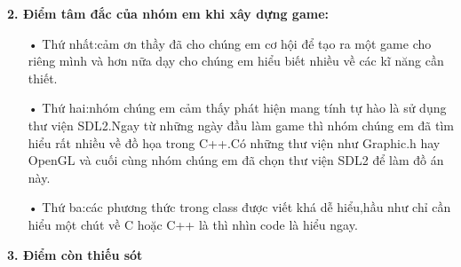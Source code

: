 \documentclass{article}
\begin{document}
\textbf{2. Điểm tâm đắc của nhóm em khi xây dựng game:}
\begin{itemize}
    \item [•]Thứ nhất:cảm ơn thầy đã cho chúng em cơ hội để tạo ra một game cho riêng mình và hơn nữa dạy cho chúng em hiểu biết nhiều về các kĩ năng cần thiết.
    \item[•]Thứ hai:nhóm chúng em cảm thấy phát hiện mang tính tự hào là sử dụng thư viện SDL2.Ngay từ những ngày đầu làm game thì nhóm chúng em đã tìm hiểu rất nhiều về đồ họa trong C++.Có những thư viện như Graphic.h hay OpenGL và cuối cùng nhóm chúng em đã chọn thư viện SDL2 để làm đồ án này.
    \newpage
    \item[•]Thứ ba:các phương thức trong class được viết khá dễ hiểu,hầu như chỉ cần hiểu một chút về C hoặc C++ là thì nhìn code là hiểu ngay.
    
\end{itemize}
\textbf{3. Điểm còn thiếu sót}
\end{document}
